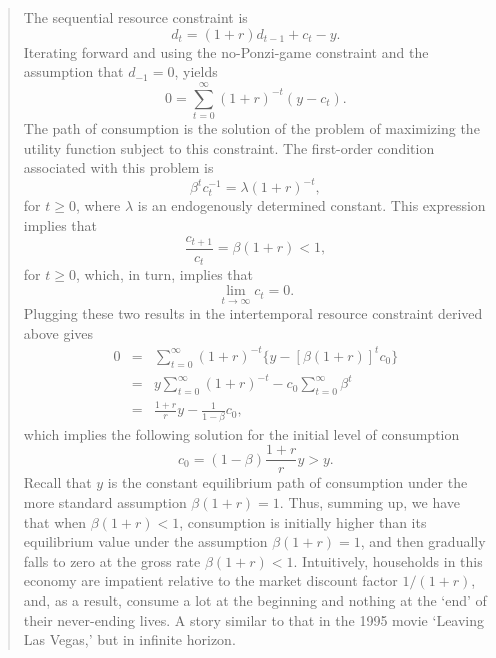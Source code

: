 \begin{exercise}
\begin{quote}
\begin{enumerate}
The sequential  resource constraint is 
\[
d_t = (1+r)d_{t-1} + c_t -y.
\]
Iterating forward and using the no-Ponzi-game constraint and the assumption that $d_{-1}=0$, yields
\[
0 = \sum_{t=0}^{\infty} (1+r)^{-t}(y-c_t). 
\]
The path of consumption is the solution of the problem of maximizing the utility function subject to this constraint. The first-order condition associated with this problem is
\[
\beta^tc_t^{-1}=\lambda (1+r)^{-t},
\]
for $t\ge 0$, where $\lambda$ is an endogenously determined constant. This expression implies that 
\[
\frac{c_{t+1}}{c_t} = \beta(1+r)<1,
\]
for $t\ge 0$, 
which, in turn, implies that
\[
\lim_{t\rightarrow \infty} c_t= 0.
\]
Plugging these two results in the intertemporal resource constraint derived above gives
\begin{eqnarray*}
0&=&  \sum_{t=0}^{\infty}
(1+r)^{-t}\{y-[\beta(1+r)]^tc_0\}
\\&=&
y\sum_{t=0}^{\infty}
(1+r)^{-t} -c_0 \sum_{t=0}^{\infty}
\beta^t \\
&=& \frac{1+r}r y-\frac1{1-\beta}c_0,
\end{eqnarray*}
which implies the following solution for the initial level of consumption
\[
c_0 = (1-\beta)\frac{1+r}r y>y.
\]
Recall that $y$ is the constant equilibrium  path of consumption under the more standard assumption  $\beta(1+r)=1$.  Thus, summing up, we have that when $\beta(1+r)<1$,  consumption is initially higher than its equilibrium value under the assumption $\beta(1+r)=1$, and then gradually falls to zero at the gross rate $\beta(1+r)<1$. Intuitively, households in this economy are impatient relative to the market discount factor $1/(1+r)$, and, as a result, consume a lot at the beginning and nothing at the `end' of their never-ending lives. A story similar to that in the 1995 movie  `Leaving Las Vegas,' but in infinite horizon. 


\end{enumerate}
\end{quote}
\end{exercise}
